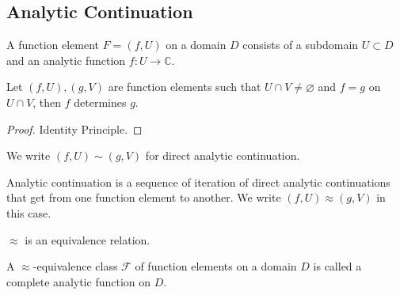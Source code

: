 \subsection{Analytic Continuation}
\begin{definition}
    A function element $F=(f,U)$ on a domain $D$ consists of a subdomain $U\subset D$ and an analytic function $f:U\to\mathbb C$.
\end{definition}
\begin{lemma}
    Let $(f,U),(g,V)$ are function elements such that $U\cap V\neq\varnothing$ and $f=g$ on $U\cap V$, then $f$ determines $g$.
\end{lemma}
\begin{proof}
    Identity Principle.
\end{proof}
We write $(f,U)\sim (g,V)$ for direct analytic continuation.
\begin{definition}
    Analytic continuation is a sequence of iteration of direct analytic continuations that get from one function element to another.
    We write $(f,U)\approx (g,V)$ in this case.
\end{definition}
\begin{remark}
    $\approx$ is an equivalence relation.
\end{remark}
\begin{definition}
    A $\approx$-equivalence class $\mathcal F$ of function elements on a domain $D$ is called a complete analytic function on $D$.
\end{definition}
